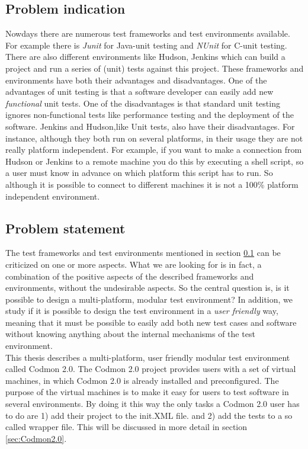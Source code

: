 \documentclass[a4paper,10pt]{scrartcl}
\newcommand{\project}{Codmon 2.0}
\newcommand{\CS}{C\nolinebreak\hspace{-.05em}\raisebox{.6ex}{\bf \#}}
\begin{document}
\subsection{Problem indication}
\label{subsec:Problemindication}
Nowdays there are numerous test frameworks and test environments available. For example there is \emph{Junit}\cite{Junit} for Java-unit testing and \emph{NUnit}\cite{Nunit} for \CS{}-unit testing.
There are also different environments like Hudson\cite{HudsonDoc}\cite{Hudson}, Jenkins\cite{JenkinsDoc} which can build a project and run a series of (unit) tests against this project. 
These frameworks and environments have both their advantages and disadvantages. One of the advantages of unit testing is that a software developer can easily add new \emph{functional} unit tests.
One of the disadvantages is that standard unit testing ignores non-functional tests like performance testing and the deployment of the software. Jenkins and Hudson,like Unit tests, also have their
disadvantages. For instance, although they both run on several platforms, in their usage they are not really platform independent. For example, if you want
to make a connection from Hudson or Jenkins to a remote machine you do this by executing a shell script, so a user must know in advance on which platform this script has to run.
So although it is possible to connect to different machines it is not a 100\% platform independent environment.
 
\subsection{Problem statement}
\label{subsec:Problemstatement}
The test frameworks and test environments mentioned in section \ref{subsec:Problemindication} can be criticized on one or more aspects. What we are looking for is in fact, a combination
of the positive aspects of the described frameworks and environments, without the undesirable aspects. So the central question is, is it possible to design a
multi-platform, modular test environment? In addition, we study if it is possible to design the test environment in a \emph{user friendly} way, meaning that it must
be possible to easily add both new test cases and software without knowing anything about the internal mechanisms of the test environment.\\

\noindent This thesis describes a multi-platform, user friendly modular test environment called \project{}. The \project{} project provides users with a set of virtual machines,
in which \project{} is already installed and preconfigured. The purpose of the virtual machines is to make it easy for users to test software in several environments. By doing it this way the only tasks
a \project{} user has to do are 1) add their project  to the init.XML file. and 2) add the tests to a so called wrapper file. This will be discussed in more detail in 
section \ref{sec:Codmon2.0}.
\end{document}
